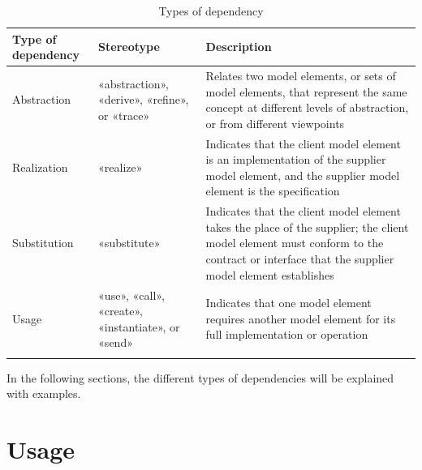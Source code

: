 \documentclass[
	12pt,
    a4paper,
    egregdoesnotlikesansseriftitles, %
    toc=chapterentrywithdots,
    oneside, openany,
    titlepage,
    parskip=half,
    headings=normal,  %
    listof=totoc,
    bibliography=totocnumbered,
    index=totoc,
    captions=tableheading,  %
    listof=flat,
    numbers=noenddot, %
    final]
    {scrbook}
\begin{document}
\vspace{1em}
{\RaggedRight
\begin{longtable} {|p{3.5cm}|p{3.25cm}|p{6.5cm}|}
		\hline
		\textbf{Type of dependency} & \textbf{Stereotype} & \textbf{Description} \\
		\hline
		Abstraction & «abstraction», «derive», «refine», or «trace» & Relates two model elements, or sets of model elements, that represent the same concept at different levels of abstraction, or from different viewpoints  \\ 
		\hline
		Realization & «realize» & 	Indicates that the client model element is an implementation of the supplier model element, and the supplier model element is the specification \\ 
		\hline
		Substitution & «substitute» & Indicates that the client model element takes the place of the supplier; the client model element must conform to the contract or interface that the supplier model element establishes  \\ 
		\hline
		Usage & «use», «call», «create», «instantiate», or «send» & Indicates that one model element requires another model element for its full implementation or operation  \\ 
		\hline
	\caption[Types of dependencies]{Types of dependency \cite{ibm_dependencies} \cite{uml}}
	\label{tab:dependencies}
\end{longtable}
}

In the following sections, the different types of dependencies will be explained with examples.

\section{Usage}
\end{document}
